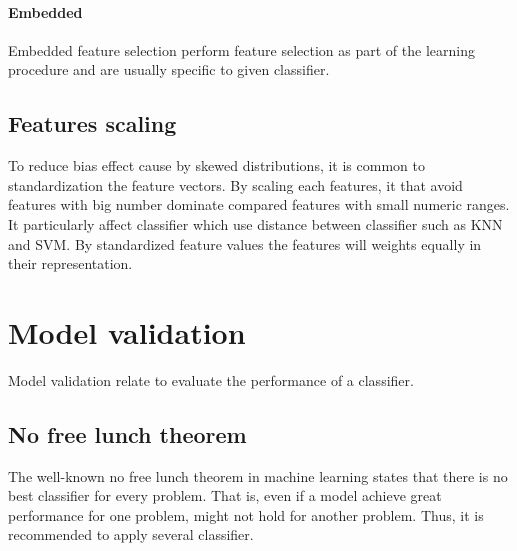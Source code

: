 \documentclass[USenglish]{ifimaster}  %
\begin{document}
	
\paragraph{Embedded}
Embedded feature selection perform feature selection as part of the learning procedure and are usually specific to given classifier.

\subsection{Features scaling}
\label{subsec:scaling}
To reduce bias effect cause by skewed distributions, it is common to standardization the feature vectors. By scaling each features, it that avoid features with big number dominate compared features with small numeric ranges. It particularly affect classifier which use distance between classifier such as KNN and SVM.  By standardized feature values the features will weights equally in their representation.
	
	
\section{Model validation}
Model validation relate to evaluate the performance of a classifier. 
	
\subsection{No free lunch theorem} \label{seq:nofree}
The well-known no free lunch theorem\cite{NOFREELUNCH} in machine learning states that there is no best classifier for every problem. That is, even if a model achieve great performance for one problem, might not hold for another problem. Thus, it is recommended to apply several classifier.
	
\end{document}
